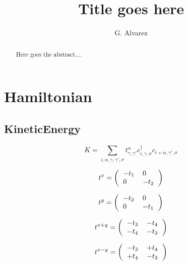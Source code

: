 \documentclass[twocolumn,showpacs,preprintnumbers,amsmath,amssymb,prb]{revtex4}
\begin{document}
\title{Title goes here}
\author{G. Alvarez}

\begin{abstract}
Here goes the abstract....
\end{abstract}

\maketitle

\section{Hamiltonian}
\subsection{KineticEnergy}
\begin{equation}
K=\sum_{i,\alpha,\gamma,\gamma',\sigma}
t^\alpha_{\gamma,\gamma'} c^\dagger_{i,\gamma,\sigma}c_{i+\alpha,\gamma',\sigma}
\end{equation}

\begin{equation}
t^x=\left(
\begin{tabular}{ll}
$-t_1$ & 0\\
0 & $-t_2$
\end{tabular}
\right)
\end{equation}


	
\begin{equation}
t^y=\left(
\begin{tabular}{ll}
$-t_2$ & 0\\
0 & $-t_1$
\end{tabular}
\right)
\end{equation}


\begin{equation}
t^{x+y}=\left(
\begin{tabular}{ll}
$-t_3$ & $-t_4$\\
$-t_4$ & $-t_3$
\end{tabular}
\right)
\end{equation}

\begin{equation}
t^{x-y}=\left(
\begin{tabular}{ll}
$-t_3$ & $+t_4$\\
$+t_4$ & $-t_3$
\end{tabular}
\right)
\end{equation}
\end{document}
